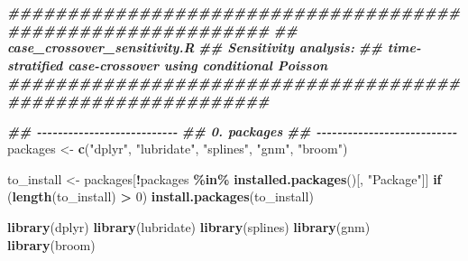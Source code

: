 \documentclass[
]{article}
\newenvironment{Shaded}{\begin{snugshade}}{\end{snugshade}}
\newcommand{\ControlFlowTok}[1]{\textcolor[rgb]{0.13,0.29,0.53}{\textbf{#1}}}
\newcommand{\DecValTok}[1]{\textcolor[rgb]{0.00,0.00,0.81}{#1}}
\newcommand{\DocumentationTok}[1]{\textcolor[rgb]{0.56,0.35,0.01}{\textbf{\textit{#1}}}}
\newcommand{\FunctionTok}[1]{\textcolor[rgb]{0.13,0.29,0.53}{\textbf{#1}}}
\newcommand{\NormalTok}[1]{#1}
\newcommand{\OtherTok}[1]{\textcolor[rgb]{0.56,0.35,0.01}{#1}}
\newcommand{\SpecialCharTok}[1]{\textcolor[rgb]{0.81,0.36,0.00}{\textbf{#1}}}
\newcommand{\StringTok}[1]{\textcolor[rgb]{0.31,0.60,0.02}{#1}}
\begin{document}
\begin{Shaded}
\begin{Highlighting}[]
\DocumentationTok{\#\#\#\#\#\#\#\#\#\#\#\#\#\#\#\#\#\#\#\#\#\#\#\#\#\#\#\#\#\#\#\#\#\#\#\#\#\#\#\#\#\#\#\#\#\#\#\#\#\#\#\#\#\#\#\#\#\#\#\#}
\DocumentationTok{\#\# case\_crossover\_sensitivity.R}
\DocumentationTok{\#\# Sensitivity analysis:}
\DocumentationTok{\#\# time{-}stratified case{-}crossover using conditional Poisson}
\DocumentationTok{\#\#\#\#\#\#\#\#\#\#\#\#\#\#\#\#\#\#\#\#\#\#\#\#\#\#\#\#\#\#\#\#\#\#\#\#\#\#\#\#\#\#\#\#\#\#\#\#\#\#\#\#\#\#\#\#\#\#\#\#}

\DocumentationTok{\#\# {-}{-}{-}{-}{-}{-}{-}{-}{-}{-}{-}{-}{-}{-}{-}{-}{-}{-}{-}{-}{-}{-}{-}{-}{-}{-}{-}}
\DocumentationTok{\#\# 0. packages}
\DocumentationTok{\#\# {-}{-}{-}{-}{-}{-}{-}{-}{-}{-}{-}{-}{-}{-}{-}{-}{-}{-}{-}{-}{-}{-}{-}{-}{-}{-}{-}}
\NormalTok{packages }\OtherTok{\textless{}{-}} \FunctionTok{c}\NormalTok{(}\StringTok{"dplyr"}\NormalTok{, }\StringTok{"lubridate"}\NormalTok{, }\StringTok{"splines"}\NormalTok{, }\StringTok{"gnm"}\NormalTok{, }\StringTok{"broom"}\NormalTok{)}

\NormalTok{to\_install }\OtherTok{\textless{}{-}}\NormalTok{ packages[}\SpecialCharTok{!}\NormalTok{packages }\SpecialCharTok{\%in\%} \FunctionTok{installed.packages}\NormalTok{()[, }\StringTok{"Package"}\NormalTok{]]}
\ControlFlowTok{if}\NormalTok{ (}\FunctionTok{length}\NormalTok{(to\_install) }\SpecialCharTok{\textgreater{}} \DecValTok{0}\NormalTok{) }\FunctionTok{install.packages}\NormalTok{(to\_install)}

\FunctionTok{library}\NormalTok{(dplyr)}
\FunctionTok{library}\NormalTok{(lubridate)}
\FunctionTok{library}\NormalTok{(splines)}
\FunctionTok{library}\NormalTok{(gnm)}
\FunctionTok{library}\NormalTok{(broom)}
\end{Highlighting}
\end{Shaded}
\end{document}
